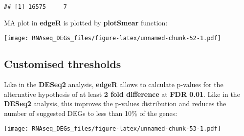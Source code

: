 \documentclass[]{book}
\newenvironment{Shaded}{\begin{snugshade}}{\end{snugshade}}
\newcommand{\KeywordTok}[1]{\textcolor[rgb]{0.13,0.29,0.53}{\textbf{#1}}}
\newcommand{\DataTypeTok}[1]{\textcolor[rgb]{0.13,0.29,0.53}{#1}}
\newcommand{\DecValTok}[1]{\textcolor[rgb]{0.00,0.00,0.81}{#1}}
\newcommand{\FloatTok}[1]{\textcolor[rgb]{0.00,0.00,0.81}{#1}}
\newcommand{\StringTok}[1]{\textcolor[rgb]{0.31,0.60,0.02}{#1}}
\newcommand{\CommentTok}[1]{\textcolor[rgb]{0.56,0.35,0.01}{\textit{#1}}}
\newcommand{\OperatorTok}[1]{\textcolor[rgb]{0.81,0.36,0.00}{\textbf{#1}}}
\newcommand{\NormalTok}[1]{#1}
\begin{document}
\begin{verbatim}
## [1] 16575     7
\end{verbatim}

MA plot in \textbf{edgeR} is plotted by \textbf{plotSmear} function:

\begin{Shaded}
\end{Shaded}

\texttt{[image: RNAseq\_DEGs\_files/figure-latex/unnamed-chunk-52-1.pdf]}

\subsection{Customised thresholds}\label{customised-thresholds}

Like in the \textbf{DESeq2} analysis, \textbf{edgeR} allows to calculate
p-values for the alternative hypothesis of at least \textbf{2 fold
difference} at \textbf{FDR 0.01}. Like in the \textbf{DESeq2} analysis,
this improves the p-values distribution and reduces the number of
suggested DEGs to less than 10\% of the genes:

\begin{Shaded}
\end{Shaded}

\texttt{[image: RNAseq\_DEGs\_files/figure-latex/unnamed-chunk-53-1.pdf]}
\end{document}
